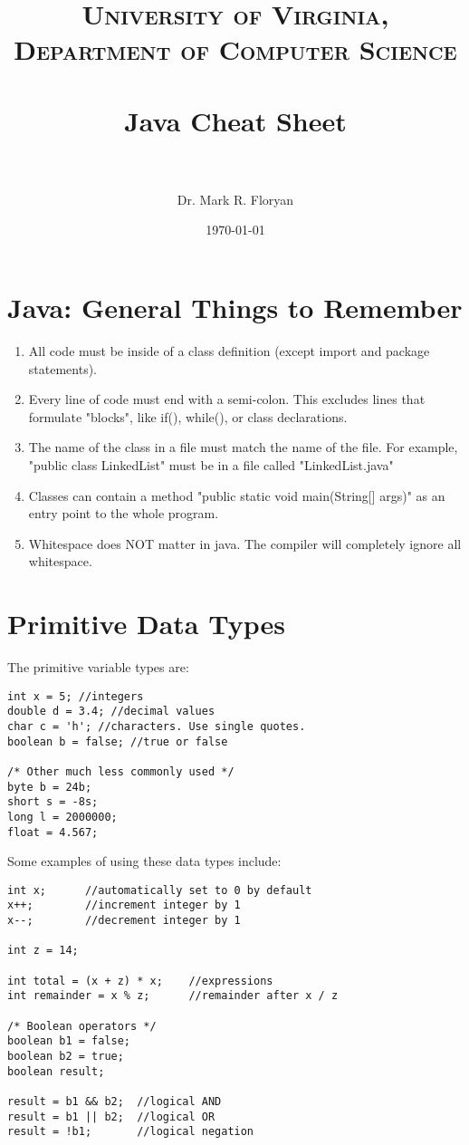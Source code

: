 \documentclass[paper=a4, fontsize=11pt, parskip=full]{scrartcl} %
\title{	
\normalfont \normalsize 
\textsc{University of Virginia, Department of Computer Science} \\ [25pt] %
\horrule{0.5pt} \\[0.4cm] %
\huge Java Cheat Sheet \\ %
\horrule{2pt} \\[0.5cm] %
}
\author{Dr. Mark R. Floryan} %
\date{\normalsize\today} %
\numberwithin{equation}{section} %
\numberwithin{figure}{section} %
\numberwithin{table}{section} %
\begin{document}
\maketitle %


\section{Java: General Things to Remember}

\begin{enumerate}
	\item All code must be inside of a class definition (except import and package statements).
	\item Every line of code must end with a semi-colon. This excludes lines that formulate "blocks", like if(), while(), or class declarations.
	\item The name of the class in a file must match the name of the file. For example, "public class LinkedList" must be in a file called "LinkedList.java"
	\item Classes can contain a method "public static void main(String[] args)" as an entry point to the whole program.
	\item Whitespace does NOT matter in java. The compiler will completely ignore all whitespace.
\end{enumerate}

\section{Primitive Data Types}

The primitive variable types are:

\begin{lstlisting}
int x = 5; //integers
double d = 3.4; //decimal values
char c = 'h'; //characters. Use single quotes.
boolean b = false; //true or false

/* Other much less commonly used */
byte b = 24b;
short s = -8s;
long l = 2000000;
float = 4.567;
\end{lstlisting}

Some examples of using these data types include:

\begin{lstlisting}
int x; 		//automatically set to 0 by default
x++; 		//increment integer by 1
x--; 		//decrement integer by 1

int z = 14;

int total = (x + z) * x; 	//expressions
int remainder = x % z; 		//remainder after x / z

/* Boolean operators */
boolean b1 = false;
boolean b2 = true;
boolean result;

result = b1 && b2; 	//logical AND
result = b1 || b2; 	//logical OR
result = !b1; 		//logical negation
\end{lstlisting}
\end{document}

